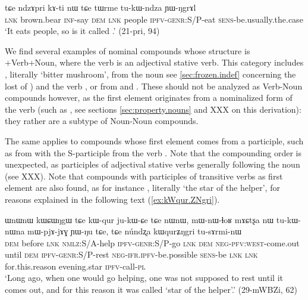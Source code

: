 \begin{exe}
\ex \label{ex:ndzApri}
\gll tɕe ndzɤpri kɤ-ti nɯ tɕe tɯrme tu-kɯ-ndza ɲɯ-ŋgrɤl \\
\textsc{lnk} brown.bear \textsc{inf}-say \textsc{dem} \textsc{lnk} people \textsc{ipfv}-\textsc{genr}:S/P-eat \textsc{sens}-be.usually.the.case \\
\glt `It eats people, so is it called .' (21-pri, 94)
\end{exe} 

We find several examples of nominal compounds whose structure is +Verb+Noun, where the verb is an adjectival stative verb. This category includes , literally `bitter mushroom', from the noun  see \ref{sec:frozen.indef} concerning the lost of ) and the verb , or  from  and . These should not be analyzed as Verb-Noun compounds however, as the first element originates from a nominalized form of the verb (such as , see sections \ref{sec:property.nouns} and XXX on this derivation): they rather are a subtype of Noun-Noun compounds.

The same applies to compounds whose first element comes from a participle, such as  from  with the S-participle   from the verb . Note that the compounding order is unexpected, as participles of adjectival stative verbs generally following the noun (see XXX). Note that compounds with participles of transitive verbs as first element are also found, as for instance , literally `the star of the helper', for reasons explained in the following text (\ref{ex:kWqur.ZNgri}).

\begin{exe}
\ex \label{ex:kWqur.ZNgri}
\gll ɯnɯnɯ kɯɕɯŋgɯ tɕe kɯ-qur ju-kɯ-ɕe tɕe nɯnɯ, mɯ-nɯ-ɬoʁ mɤɕtʂa nɯ tu-kɯ-nɯna mɯ-pjɤ-jɤɣ ɲɯ-ŋu tɕe,  tɕe núndʐa kɯqurʑŋgri tu-sɤrmi-nɯ \\
\textsc{dem} before \textsc{lnk} \textsc{nmlz}:S/A-help \textsc{ipfv}-\textsc{genr}:S/P-go \textsc{lnk} \textsc{dem} \textsc{neg}-\textsc{pfv}:\textsc{west}-come.out until \textsc{dem} \textsc{ipfv}-\textsc{genr}:S/P-rest \textsc{neg}-\textsc{ifr}.\textsc{ipfv}-be.possible \textsc{sens}-be \textsc{lnk} \textsc{lnk} for.this.reason evening.star \textsc{ipfv}-call-\textsc{pl} \\
\glt `Long ago, when one would go helping, one was not supposed to rest until it comes out, and for this reason it was called `star of the helper'.' (29-mWBZi, 62)
\end{exe}

